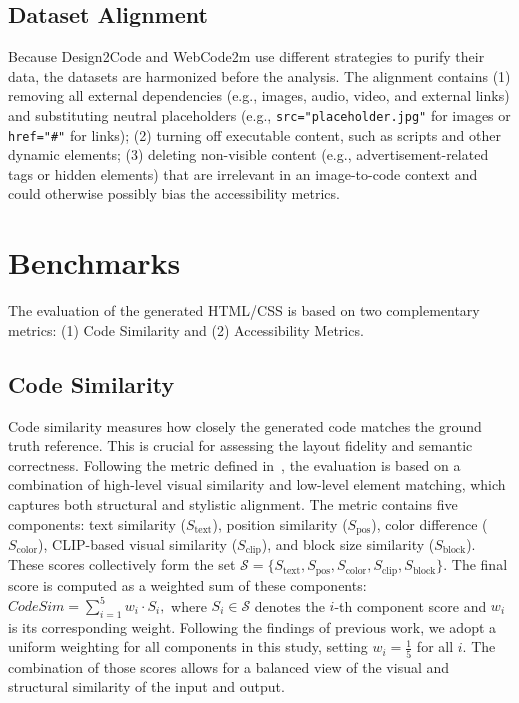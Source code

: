 \subsection{Dataset Alignment}
Because Design2Code and WebCode2m use different strategies to purify 
their data, the datasets are harmonized before the analysis. 
The alignment contains (1) removing all external dependencies (e.g., images, audio, 
video, and external links) and substituting neutral placeholders (e.g., \texttt{src="placeholder.jpg"}
for images or \texttt{href="\#"} for links); (2) turning off executable content, 
such as scripts and other dynamic elements; (3) deleting non-visible content (e.g.,
advertisement-related tags or hidden elements) that are irrelevant in 
an image-to-code context and could otherwise possibly bias 
the accessibility metrics.


\section{Benchmarks}
The evaluation of the generated HTML/CSS is based on two complementary 
metrics: (1) Code Similarity and (2) Accessibility Metrics.

\subsection{Code Similarity}
Code similarity measures how closely the generated code matches the ground
truth reference. This is crucial for assessing the layout fidelity and 
semantic correctness. Following the metric defined in~\cite{si2024design2code}, 
the evaluation is based on a combination of high-level visual 
similarity and low-level element matching, which captures both 
structural and stylistic alignment. 
The metric contains five components:
text similarity (\(S_{\text{text}}\)), position similarity 
(\(S_{\text{pos}}\)), color difference (\(S_{\text{color}}\)), 
CLIP-based visual similarity (\(S_{\text{clip}}\)), 
and block size similarity (\(S_{\text{block}}\)). 
These scores collectively form the set 
\(\mathcal{S} = \{S_{\text{text}}, S_{\text{pos}}, S_{\text{color}}, S_{\text{clip}}, S_{\text{block}}\}\). 
The final score is computed as a weighted sum of these components:
\(
\textit{CodeSim} = \sum_{i=1}^{5} w_i \cdot S_i,
\)
where \(S_i \in \mathcal{S}\) denotes the \(i\)-th component score and \(w_i\) is its corresponding weight.
Following the findings of previous work, we adopt a uniform weighting for all components in this study, setting \(w_i = \frac{1}{5}\) for all \(i\).
The combination of those scores allows for a balanced view of the visual and 
structural similarity of the input and output.

